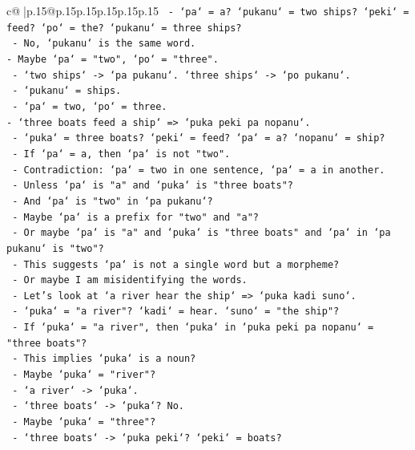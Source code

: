 \documentclass{article}
\begin{document}
{\begin{supertabular}{c@{$\;$}|p{.15\linewidth}@{}p{.15\linewidth}p{.15\linewidth}p{.15\linewidth}p{.15\linewidth}p{.15\linewidth}}
{{{\texttt{  {-} `pa` = a? `pukanu` = two ships? `peki` = feed? `po` = the? `pukanu` = three ships?} \\
\texttt{  {-} No, `pukanu` is the same word.} \\
\texttt{{-} Maybe `pa` = "two", `po` = "three".} \\
\texttt{  {-} `two ships` {-}> `pa pukanu`. `three ships` {-}> `po pukanu`.} \\
\texttt{  {-} `pukanu` = ships.} \\
\texttt{  {-} `pa` = two, `po` = three.} \\
\texttt{{-} `three boats feed a ship` => `puka peki pa nopanu`.} \\
\texttt{  {-} `puka` = three boats? `peki` = feed? `pa` = a? `nopanu` = ship?} \\
\texttt{  {-} If `pa` = a, then `pa` is not "two".} \\
\texttt{  {-} Contradiction: `pa` = two in one sentence, `pa` = a in another.} \\
\texttt{  {-} Unless `pa` is "a" and `puka` is "three boats"?} \\
\texttt{  {-} And `pa` is "two" in `pa pukanu`?} \\
\texttt{  {-} Maybe `pa` is a prefix for "two" and "a"?} \\
\texttt{  {-} Or maybe `pa` is "a" and `puka` is "three boats" and `pa` in `pa pukanu` is "two"?} \\
\texttt{  {-} This suggests `pa` is not a single word but a morpheme?} \\
\texttt{  {-} Or maybe I am misidentifying the words.} \\
\texttt{  {-} Let's look at `a river hear the ship` => `puka kadi suno`.} \\
\texttt{    {-} `puka` = "a river"? `kadi` = hear. `suno` = "the ship"?} \\
\texttt{    {-} If `puka` = "a river", then `puka` in `puka peki pa nopanu` = "three boats"?} \\
\texttt{    {-} This implies `puka` is a noun?} \\
\texttt{    {-} Maybe `puka` = "river"?} \\
\texttt{    {-} `a river` {-}> `puka`.} \\
\texttt{    {-} `three boats` {-}> `puka`? No.} \\
\texttt{    {-} Maybe `puka` = "three"?} \\
\texttt{    {-} `three boats` {-}> `puka peki`? `peki` = boats?} \\
}}}
\end{supertabular}}
\end{document}
